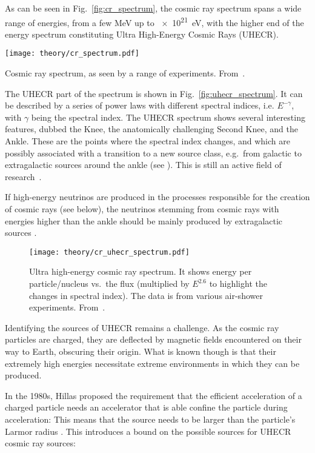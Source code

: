 As can be seen in Fig.~\ref{fig:cr_spectrum}, the cosmic ray spectrum spans a wide range of energies, from a few \unit{\mega\eV} up to \SI{e21}{\eV}, with the higher end of the energy spectrum constituting Ultra High-Energy Cosmic Rays (UHECR).

\begin{marginfigure}
    \texttt{[image: theory/cr\_spectrum.pdf]}
    \caption[Cosmic ray spectrum]{Cosmic ray spectrum, as seen by a range of experiments. From~\cite{Hillas2006}.}
\end{marginfigure}

The UHECR part of the spectrum is shown in Fig.~\ref{fig:uhecr_spectrum}. It can be described by a series of power laws with different spectral indices, i.e. $E^{-\gamma}$, with $\gamma$ being the spectral index. The UHECR spectrum shows several interesting features, dubbed the Knee, the anatomically challenging Second Knee, and the Ankle. These are the points where the spectral index changes, and which are possibly associated with a transition to a new source class, e.g.\ from galactic to extragalactic sources around the ankle (see ). This is still an active field of research~\cite{Workman2022}.

If high-energy neutrinos are produced in the processes responsible for the creation of cosmic rays (see below), the neutrinos stemming from cosmic rays with energies higher than the ankle should be mainly produced by extragalactic sources .

\begin{figure}[htb]
    \texttt{[image: theory/cr\_uhecr\_spectrum.pdf]}
    \caption[UHECR spectrum]{Ultra high-energy cosmic ray spectrum. It shows energy per particle/nucleus vs.\ the flux (multiplied by $E^{2.6}$ to highlight the changes in spectral index). The data is from various air-shower experiments. From~\cite{Workman2022}.}
\end{figure}

Identifying the sources of UHECR remains a challenge. As the cosmic ray particles are charged, they are deflected by magnetic fields encountered on their way to Earth, obscuring their origin. What is known though is that their extremely high energies necessitate extreme environments in which they can be produced.

In the 1980s, Hillas proposed the requirement that the efficient acceleration of a charged particle needs an accelerator that is able confine the particle during acceleration: This means that the source needs to be larger than the particle's Larmor radius . This introduces a bound on the possible sources for UHECR cosmic ray sources:

